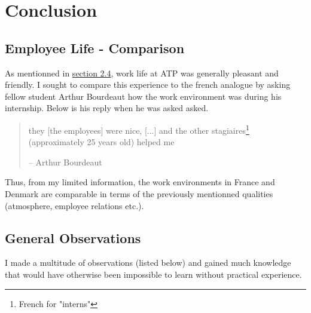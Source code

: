 \section{Conclusion}

\subsection{Employee Life - Comparison}

As mentionned in \hyperlink{subsection.2.4}{section 2.4}, work life at ATP was
generally pleasant and friendly. I sought to compare this experience to the
french analogue by asking fellow student Arthur Bourdeaut how the work
environment was during his internship. Below is his reply when he was asked
asked.

\begin{quote}
    \color{dgreen} they [the employees] were nice, [...] and the other
    stagiaires\footnote[0]{French for "interns"} (approximately 25 years old)
    helped me

    \color{black} -- Arthur Bourdeaut
\end{quote}

Thus, from my limited information, the work environments in France and Denmark
are comparable in terms of the previously mentionned qualities (atmosphere,
employee relations etc.).

\subsection{General Observations}

I made a multitude of observations (listed below) and gained much knowledge that
would have otherwise been impossible to learn without practical experience.

